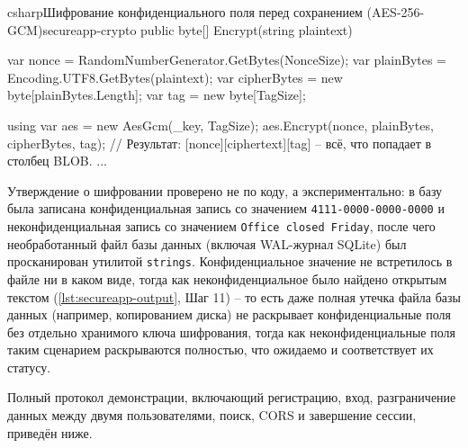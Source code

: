 \begin{codelisting}[fontsize=\footnotesize]{csharp}{Шифрование конфиденциального поля перед сохранением (AES-256-GCM)}{secureapp-crypto}
public byte[] Encrypt(string plaintext)
{
    var nonce = RandomNumberGenerator.GetBytes(NonceSize);
    var plainBytes = Encoding.UTF8.GetBytes(plaintext);
    var cipherBytes = new byte[plainBytes.Length];
    var tag = new byte[TagSize];

    using var aes = new AesGcm(_key, TagSize);
    aes.Encrypt(nonce, plainBytes, cipherBytes, tag);
    // Результат: [nonce][ciphertext][tag] -- всё, что попадает в столбец BLOB.
    ...
}
\end{codelisting}

Утверждение о шифровании проверено не по коду, а экспериментально: в базу
была записана конфиденциальная запись со значением
\texttt{4111-0000-0000-0000} и неконфиденциальная запись со значением
\texttt{Office closed Friday}, после чего необработанный файл базы данных
(включая WAL-журнал SQLite) был просканирован утилитой \texttt{strings}.
Конфиденциальное значение не встретилось в файле ни в каком виде, тогда
как неконфиденциальное было найдено открытым текстом
(\autoref{lst:secureapp-output}, Шаг 11) -- то есть даже полная утечка
файла базы данных (например, копированием диска) не раскрывает
конфиденциальные поля без отдельно хранимого ключа шифрования, тогда как
неконфиденциальные поля таким сценарием раскрываются полностью, что
ожидаемо и соответствует их статусу.

Полный протокол демонстрации, включающий регистрацию, вход, разграничение
данных между двумя пользователями, поиск, CORS и завершение сессии,
приведён ниже.


